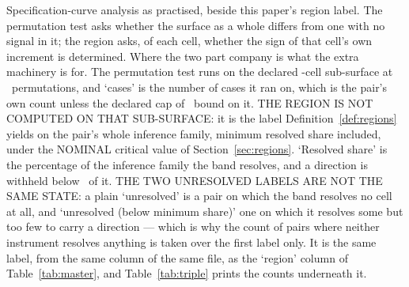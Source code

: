 \begin{landscape}
\begin{table}[t]
\caption{Specification-curve analysis as practised, beside this paper's region label. The permutation test asks whether the surface as a whole differs from one with no signal in it; the region asks, of each cell, whether the sign of that cell's own increment is determined. Where the two part company is what the extra machinery is for. The permutation test runs on the declared \nScaCells-cell sub-surface at \nScaPerms\ permutations, and `cases' is the number of cases it ran on, which is the pair's own count unless the declared cap of \nScaMaxCases\ bound on it. THE REGION IS NOT COMPUTED ON THAT SUB-SURFACE: it is the label Definition~\ref{def:regions} yields on the pair's whole inference family, minimum resolved share included, under the NOMINAL critical value of Section~\ref{sec:regions}. `Resolved share' is the percentage of the inference family the band resolves, and a direction is withheld below \minResolvedSharePct\ of it. THE TWO UNRESOLVED LABELS ARE NOT THE SAME STATE: a plain `unresolved' is a pair on which the band resolves no cell at all, and `unresolved (below minimum share)' one on which it resolves some but too few to carry a direction --- which is why the count of pairs where neither instrument resolves anything is taken over the first label only. It is the same label, from the same column of the same file, as the `region' column of Table~\ref{tab:master}, and Table~\ref{tab:triple} prints the counts underneath it.}
\label{tab:sca}
\end{table}
\end{landscape}
